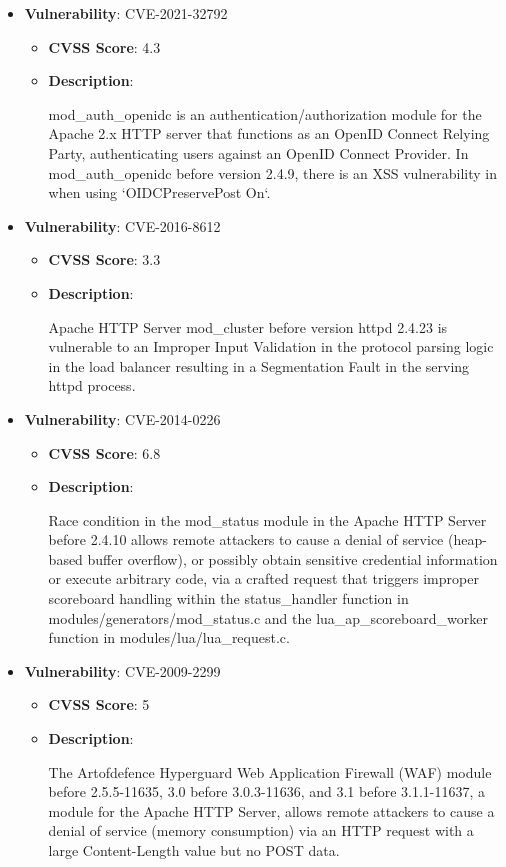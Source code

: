 \documentclass{article}
\begin{document}
\begin{itemize}
        \item \textbf{Vulnerability}: CVE-2021-32792
        \begin{itemize}
            \item \textbf{CVSS Score}:  4.3 
            \item \textbf{Description}:
            \parbox[t]{0.9\linewidth}{
                \ttfamily mod\_auth\_openidc is an authentication/authorization module for the Apache 2.x HTTP server that functions as an OpenID Connect Relying Party, authenticating users against an OpenID Connect Provider. In mod\_auth\_openidc before version 2.4.9, there is an XSS vulnerability in when using `OIDCPreservePost On`.
            }
        \end{itemize}
    
        \item \textbf{Vulnerability}: CVE-2016-8612
        \begin{itemize}
            \item \textbf{CVSS Score}:  3.3 
            \item \textbf{Description}:
            \parbox[t]{0.9\linewidth}{
                \ttfamily Apache HTTP Server mod\_cluster before version httpd 2.4.23 is vulnerable to an Improper Input Validation in the protocol parsing logic in the load balancer resulting in a Segmentation Fault in the serving httpd process.
            }
        \end{itemize}
    
        \item \textbf{Vulnerability}: CVE-2014-0226
        \begin{itemize}
            \item \textbf{CVSS Score}:  6.8 
            \item \textbf{Description}:
            \parbox[t]{0.9\linewidth}{
                \ttfamily Race condition in the mod\_status module in the Apache HTTP Server before 2.4.10 allows remote attackers to cause a denial of service (heap-based buffer overflow), or possibly obtain sensitive credential information or execute arbitrary code, via a crafted request that triggers improper scoreboard handling within the status\_handler function in modules/generators/mod\_status.c and the lua\_ap\_scoreboard\_worker function in modules/lua/lua\_request.c.
            }
        \end{itemize}
    
        \item \textbf{Vulnerability}: CVE-2009-2299
        \begin{itemize}
            \item \textbf{CVSS Score}:  5 
            \item \textbf{Description}:
            \parbox[t]{0.9\linewidth}{
                \ttfamily The Artofdefence Hyperguard Web Application Firewall (WAF) module before 2.5.5-11635, 3.0 before 3.0.3-11636, and 3.1 before 3.1.1-11637, a module for the Apache HTTP Server, allows remote attackers to cause a denial of service (memory consumption) via an HTTP request with a large Content-Length value but no POST data.
            }
        \end{itemize}
    

\end{itemize}
\end{document}

